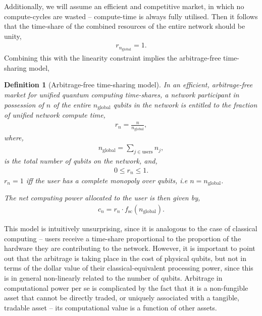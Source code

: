 \documentclass[aps, rmp, twocolumn, amsmath, amssymb, nofootinbib, superscriptaddress, longbibliography, floatfix, table-of-contents, eqsecnum]{revtex4-1}
\newtheorem{definition}{Definition}
\begin{document}
Additionally, we will assume an efficient and competitive market, in which no compute-cycles are wasted -- compute-time is always fully utilised. Then it follows that the time-share of the combined resources of the entire network should be unity,
\begin{align}
	r_{n_\text{global}}=1.
\end{align}
Combining this with the linearity constraint implies the arbitrage-free time-sharing model,
\begin{definition}[Arbitrage-free time-sharing model] \label{def:arb_free_ts}
In an efficient, arbitrage-free market for unified quantum computing time-shares, a network participant in possession of $n$ of the entire $n_\text{global}$ qubits in the network is entitled to the fraction of unified network compute time,
\begin{align}
	r_n = \frac{n}{n_\text{global}},
\end{align}
where,
\begin{align}
n_\text{global} = \sum_{j\in\text{users}} n_j,
\end{align}
is the total number of qubits on the network, and,
\begin{align}
0\leq r_n \leq 1.	
\end{align}
\mbox{$r_n=1$} iff the user has a complete monopoly over qubits, i.e \mbox{$n=n_\text{global}$}.

The net computing power allocated to the user is then given by,
\begin{align}
	c_n = r_n \cdot f_\text{sc}(n_\text{global}).
\end{align}
\end{definition}

This model is intuitively unsurprising, since it is analogous to the case of classical computing -- users receive a time-share proportional to the proportion of the hardware they are contributing to the network. However, it is important to point out that the arbitrage is taking place in the cost of physical qubits, but not in terms of the dollar value of their classical-equivalent processing power, since this is in general non-linearly related to the number of qubits. Arbitrage in computational power per se is complicated by the fact that it is a non-fungible asset that cannot be directly traded, or uniquely associated with a tangible, tradable asset -- its computational value is a function of other assets.

%
%
\end{document}
